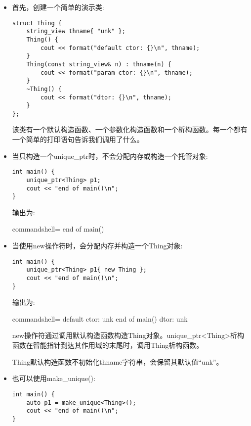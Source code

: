 \begin{itemize}
\item 
首先，创建一个简单的演示类:

\begin{lstlisting}[style=styleCXX]
struct Thing {
	string_view thname{ "unk" };
	Thing() {
		cout << format("default ctor: {}\n", thname);
	}
	Thing(const string_view& n) : thname(n) {
		cout << format("param ctor: {}\n", thname);
	}
	~Thing() {
		cout << format("dtor: {}\n", thname);
	}
};
\end{lstlisting}

该类有一个默认构造函数、一个参数化构造函数和一个析构函数。每一个都有一个简单的打印语句告诉我们调用了什么。

\item 
当只构造一个unique\_ptr时，不会分配内存或构造一个托管对象:

\begin{lstlisting}[style=styleCXX]
int main() {
	unique_ptr<Thing> p1;
	cout << "end of main()\n";
}
\end{lstlisting}

输出为:

\begin{tcblisting}{commandshell={}}
end of main()
\end{tcblisting}


\item 
当使用new操作符时，会分配内存并构造一个Thing对象:

\begin{lstlisting}[style=styleCXX]
int main() {
	unique_ptr<Thing> p1{ new Thing };
	cout << "end of main()\n";
}
\end{lstlisting}

输出为:

\begin{tcblisting}{commandshell={}}
default ctor: unk
end of main()
dtor: unk
\end{tcblisting}

new操作符通过调用默认构造函数构造Thing对象。unique\_ptr<Thing>析构函数在智能指针到达其作用域的末尾时，调用Thing析构函数。

Thing默认构造函数不初始化thname字符串，会保留其默认值“unk”。

\item 
也可以使用make\_unique():

\begin{lstlisting}[style=styleCXX]
int main() {
	auto p1 = make_unique<Thing>();
	cout << "end of main()\n";
}
\end{lstlisting}


\end{itemize}
